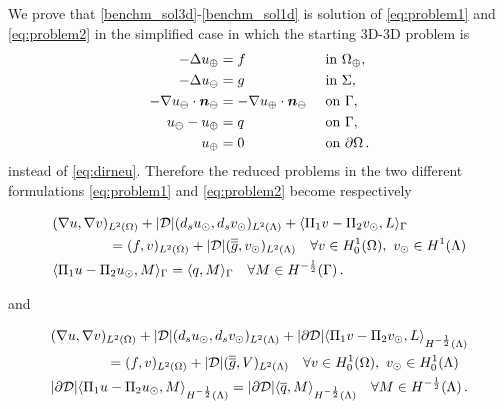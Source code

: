 We prove that \eqref{benchm_sol3d}-\eqref{benchm_sol1d} is solution of \eqref{eq:problem1} and \eqref{eq:problem2} in the simplified case in which the starting 3D-3D problem is
\begin{subequations}\label{eq:dirneu_simple}
\begin{align}
- \Delta u_{\oplus}  &= f  && \text{ in } \Omega_{\oplus},\\
- \Delta u_{\ominus} &= g  && \text{ in } \Sigma,\\
-\nabla u_{\ominus} \cdot \boldsymbol n_{\ominus} &= -\nabla u_{\oplus} \cdot \boldsymbol n_{\ominus}  && \text{ on } \Gamma,\\
u_{\ominus} - u_{\oplus} &= q  && \text{ on }  \Gamma,\\
u_{\oplus} &= 0 && \text{ on } \partial \Omega\,.
\end{align}
\end{subequations}
instead of \eqref{eq:dirneu}. Therefore the reduced problems in the two different formulations \eqref{eq:problem1} and \eqref{eq:problem2} become respectively
 
\begin{subequations}\label{eq:problem1_simple}
\begin{align}
\label{eq:problem1_simple_eq1}
&(\nabla u,\nabla v)_{L^2(\Omega)} + |{\cal D}|(d_s \ud,d_s \vd)_{L^2(\Lambda)} 
+ \langle \Pi_1 v  - \Pi_2 \vd, L \rangle_\Gamma
\\
\nonumber
&\qquad\qquad= (f,v)_{L^2(\Omega)} + |{\cal D}| (\avrd{g},\vd)_{L^2(\Lambda)}
\quad \forall v \in H^1_0(\Omega), \ \vd \in H^1(\Lambda)
\\
\label{eq:problem1_simple_eq2}
&   \langle \Pi_1 u - \Pi_2 \ud , M \rangle_\Gamma =  \langle q , M \rangle_\Gamma
\quad \forall M \in H^{-\frac12}(\Gamma)\,.
\end{align}
\end{subequations}

and

\begin{subequations}\label{eq:problem2_simple}
\begin{align}
&(\nabla u,\nabla v)_{L^2(\Omega)} + |{\cal D}|(d_s \ud,d_s \vd)_{L^2(\Lambda)} 
+ |\partial {\cal D}| \langle \Pi_1 v - \Pi_2 \vd, L \rangle_{H^{-\frac12}(\Lambda)} 
\\
\nonumber
&\qquad\qquad= (f,v)_{L^2(\Omega)} + |{\cal D}| (\avrd{g},V)_{L^2(\Lambda)}
\quad \forall v \in H^1_0(\Omega), \ \vd \in H^1_0(\Lambda)
\\
&  |\partial {\cal D}| \langle \Pi_1 u -  \Pi_2 \ud, M \rangle_{H^{-\frac12}(\Lambda)} =|\partial {\cal D}| \langle \avrc{q}, M \rangle_{H^{-\frac12}(\Lambda)}
\quad \forall M \in H^{-\frac12}(\Lambda)\,.
\end{align}
\end{subequations}

